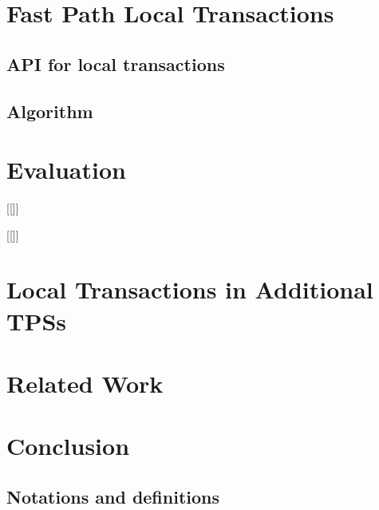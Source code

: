 \documentclass[letterpaper,twocolumn,10pt]{article}
\newcommand{\inred}[1]{{\color{red}{#1}}}
\newcommand{\Idit}[1]{[[\inred{Idit: #1}]]}
\newcommand{\sys}{Lorra}
\begin{document}
\section{Fast Path Local Transactions}
\label{sec:alg}
\subsection{API for local transactions}

\subsection{Algorithm}


\section{Evaluation} \label{sec:eval}


\Idit{Compare the following: Omid synchronous, Omid asynchronous, \sys\ without locals, \sys\ with locals, HBase.}

\Idit{Add graph showing cost of RMW (validation) in regular transaction write.}

\section{Local Transactions in Additional TPSs} \label{sec:context}


\section{Related Work} \label{sec:related}

\section{Conclusion} \label{sec:conclusions}




\newpage







\begin{appendix}
	
	\section{Notations and definitions} \label{sec:app1}


\end{appendix}
\end{document}
